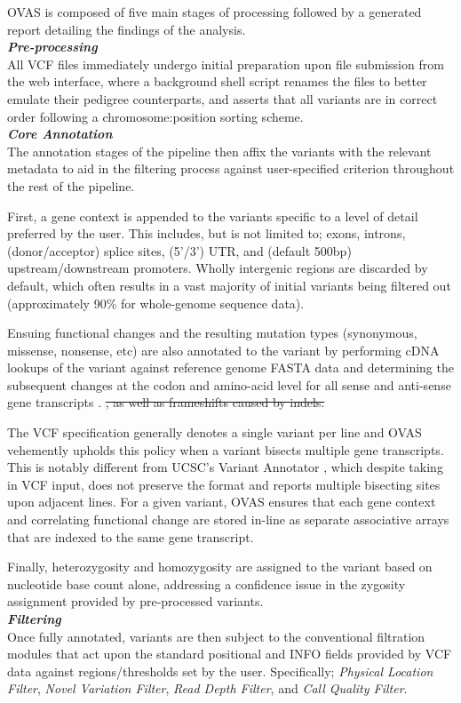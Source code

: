 \documentclass[twocolumn]{bmcart}%
\def\app{OVAS}
\newcommand{\triplesub}[2]{\noindent\textsl{#1}\\#2\\}  %
\newcommand{\horia}[1]{{\color{magenta} #1}}
\newcommand{\horiaremove}[1]{{\color{magenta}\st{#1}}}
\newcounter{changeCount}
\newcommand{\changes}[1]{
		\stepcounter{changeCount}
		{\tiny\bf\color{violet}\arabic{changeCount}}
		{\color{red} #1}
	}
\newcommand{\horia}[1]{#1}
\newcommand{\horiaremove}[1]{}  %
\newcommand{\changes}[1]{#1}
\begin{document}
\changes{\app{} is composed of five main stages of processing followed by a generated report detailing the findings of the analysis.\\

\triplesub{\bf Pre-processing}{All VCF files immediately undergo initial preparation upon file submission from the web interface, where a background shell script renames the files to better emulate their pedigree counterparts, and asserts that all variants are in correct order following a chromosome:position sorting scheme.}

\triplesub{\bf Core Annotation}{
The annotation stages of the pipeline then affix the variants with the relevant metadata to aid in the filtering process against user-specified criterion throughout the rest of the pipeline.

First, a gene context is appended to the variants specific to a level of detail preferred by the user. This includes, but is not limited to; exons, introns, (donor/acceptor) splice sites, (5'/3') UTR, and (default 500bp) upstream/downstream promoters. Wholly intergenic regions are discarded by default, which often results in a vast majority of initial variants being filtered out (approximately 90\% for whole-genome sequence data).

Ensuing functional changes and the resulting mutation types (synonymous, missense, nonsense, etc) are also annotated to the variant by performing cDNA lookups of the variant against reference genome FASTA data and determining the subsequent changes at the codon and amino-acid level for all sense and anti-sense gene transcripts\horia{.} \horiaremove{, as well as frameshifts caused by indels.}

The VCF specification generally denotes a single variant per line and OVAS vehemently upholds this policy when a variant bisects multiple gene transcripts. This is notably different from UCSC's Variant Annotator \cite{hinrichs2016ucsc}, which despite taking in VCF input, does not preserve the format and reports multiple bisecting sites upon adjacent lines. For a given variant, OVAS ensures that each gene context and correlating functional change are stored in-line as separate associative arrays that are indexed to the same gene transcript.

Finally, heterozygosity and homozygosity are assigned to the variant based on nucleotide base count alone, addressing a confidence issue in the zygosity assignment provided by pre-processed variants.
}

\triplesub{\bf Filtering}{
Once fully annotated, variants are then subject to the conventional filtration modules that act upon the standard positional and INFO fields provided by VCF data against regions/thresholds set by the user. Specifically; \textit{Physical Location Filter}, \textit{Novel Variation Filter}, \textit{Read Depth Filter}, and \textit{Call Quality Filter}.

}}
\end{document}
